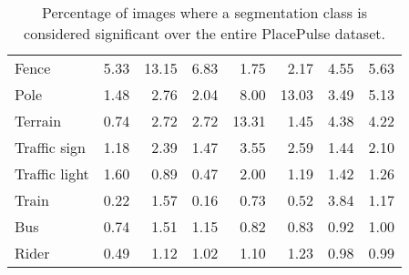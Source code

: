 \begin{table}[H]
\begin{tabular}{|l|rrrrrrr|}
		Fence         & 5.33           & 13.15          & 6.83           & 1.75           & 2.17           & 4.55           & 5.63           \\
		Pole          & 1.48           & 2.76           & 2.04           & 8.00           & 13.03          & 3.49           & 5.13           \\
		Terrain       & 0.74           & 2.72           & 2.72           & 13.31          & 1.45           & 4.38           & 4.22           \\
		Traffic sign  & 1.18           & 2.39           & 1.47           & 3.55           & 2.59           & 1.44           & 2.10           \\
		Traffic light & 1.60           & 0.89           & 0.47           & 2.00           & 1.19           & 1.42           & 1.26           \\
		Train         & 0.22           & 1.57           & 0.16           & 0.73           & 0.52           & 3.84           & 1.17           \\
		Bus           & 0.74           & 1.51           & 1.15           & 0.82           & 0.83           & 0.92           & 1.00           \\
		Rider         & 0.49           & 1.12           & 1.02           & 1.10           & 1.23           & 0.98           & 0.99 \\
		\hline
	\end{tabular}
	\caption[Percentage of class significance]{
		Percentage of images where a segmentation class is considered significant over the entire PlacePulse dataset.
	}
	\label{tab:total_sig}
\end{table}


